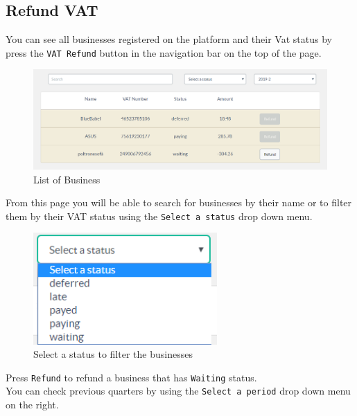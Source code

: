 	\subsection{Refund VAT}
	You can see all businesses registered on the platform and their Vat status
	by press the \texttt{VAT Refund} button in the navigation bar on the top of 
	the page. 
	\begin{figure}[H]
		\includegraphics[width=15cm]{res/images/business_list.png}
		\centering
		\caption{List of Business}
	\end{figure}
	\noindent From this page you will be able to search for businesses by their
	name or to filter them by their VAT status using the 
	\texttt{Select a status} drop down menu.
	\begin{figure}[H]
		\includegraphics[width=7cm]{res/images/vat_status_select.png}
		\centering
		\caption{Select a status to filter the businesses}
	\end{figure}
	\noindent Press \texttt{Refund} to refund a business that has
	\texttt{Waiting} status.\\
	You can check previous quarters by using the \texttt{Select a period}
	drop down menu on the right.

